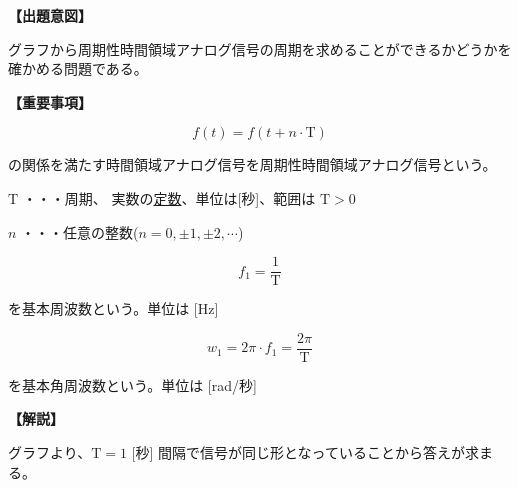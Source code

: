 \noindent \textbf{【出題意図】}

\noindent グラフから周期性時間領域アナログ信号の周期を求めることができるかどうかを確かめる問題である。

\vspace{1em}
\noindent \textbf{【重要事項】}

\[
f(t) = f(t + n \cdot \textrm{T})
\]

\noindent の関係を満たす時間領域アナログ信号を周期性時間領域アナログ信号という。

\medskip
\noindent $\textrm{T}$ ・・・周期、 実数の\underline{定数}、単位は[秒]、範囲は $\textrm{T} > 0$

\medskip
\noindent $n$ ・・・任意の整数($n = 0,\pm1,\pm2,\cdots$)

\[
f_1 = \frac{1}{\textrm{T}}
\]

\noindent を基本周波数という。単位は [Hz]

\[
w_1 = 2\pi \cdot f_1 = \frac{2\pi}{\textrm{T}}
\]

\noindent を基本角周波数という。単位は [rad/秒] 


\vspace{1em}
\noindent \textbf{【解説】}

\noindent グラフより、$\textrm{T}=1$ [秒] 間隔で信号が同じ形となっていることから答えが求まる。
